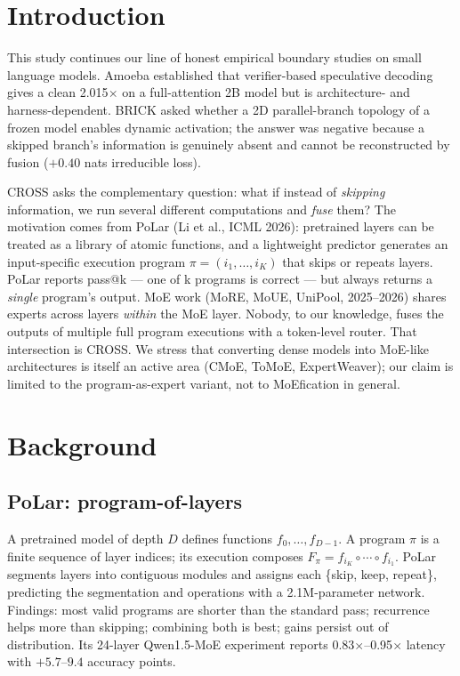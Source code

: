 \documentclass[11pt,a4paper]{article}
\begin{document}
\section{Introduction}

This study continues our line of honest empirical boundary studies on small
language models. Amoeba established that verifier-based speculative decoding gives
a clean 2.015$\times$ on a full-attention 2B model but is architecture- and
harness-dependent. BRICK asked whether a 2D parallel-branch topology of a frozen
model enables dynamic activation; the answer was negative because a skipped
branch's information is genuinely absent and cannot be reconstructed by fusion
($+0.40$ nats irreducible loss).

CROSS asks the complementary question: what if instead of \emph{skipping}
information, we run several different computations and \emph{fuse} them? The
motivation comes from PoLar (Li et al., ICML 2026): pretrained layers can be
treated as a library of atomic functions, and a lightweight predictor generates
an input-specific execution program $\pi=(i_1,\ldots,i_K)$ that skips or repeats
layers. PoLar reports pass@k --- one of k programs is correct --- but always
returns a \emph{single} program's output. MoE work (MoRE, MoUE, UniPool, 2025--2026)
shares experts across layers \emph{within} the MoE layer. Nobody, to our knowledge,
fuses the outputs of multiple full program executions with a token-level router.
That intersection is CROSS. We stress that converting dense models into
MoE-like architectures is itself an active area (CMoE, ToMoE, ExpertWeaver);
our claim is limited to the program-as-expert variant, not to MoEfication in
general.

\section{Background}

\subsection{PoLar: program-of-layers}
A pretrained model of depth $D$ defines functions $f_0,\ldots,f_{D-1}$. A program
$\pi$ is a finite sequence of layer indices; its execution composes
$F_\pi=f_{i_K}\circ\cdots\circ f_{i_1}$. PoLar segments layers into contiguous
modules and assigns each \{skip, keep, repeat\}, predicting the segmentation and
operations with a 2.1M-parameter network. Findings: most valid programs are shorter
than the standard pass; recurrence helps more than skipping; combining both is
best; gains persist out of distribution. Its 24-layer Qwen1.5-MoE experiment reports
0.83$\times$--0.95$\times$ latency with $+5.7$--$9.4$ accuracy points.
\end{document}

